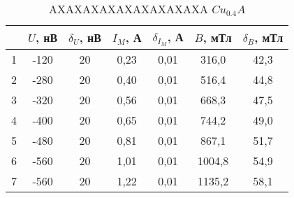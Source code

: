 \begin{table}
\centering
\caption{AXAXAXAXAXAXAXAXAXA $Cu_0.4A$}
\begin{tabular}{|c|c|c|c|c|c|c|}
\hline
 & $U$, нВ & $\delta_U$, нВ & $I_M$, А & $\delta_{I_M}$, А & $B$, мТл & $\delta_B$, мТл \\
\hline
1 & -120 & 20 & 0,23 & 0,01 & 316,0 & 42,3 \\
\cline{1-7}
2 & -280 & 20 & 0,40 & 0,01 & 516,4 & 44,8 \\
\cline{1-7}
3 & -320 & 20 & 0,56 & 0,01 & 668,3 & 47,5 \\
\cline{1-7}
4 & -400 & 20 & 0,65 & 0,01 & 744,2 & 49,0 \\
\cline{1-7}
5 & -480 & 20 & 0,81 & 0,01 & 867,1 & 51,7 \\
\cline{1-7}
6 & -560 & 20 & 1,01 & 0,01 & 1004,8 & 54,9 \\
\cline{1-7}
7 & -560 & 20 & 1,22 & 0,01 & 1135,2 & 58,1 \\
\cline{1-7}
\hline
\end{tabular}
\end{table}

